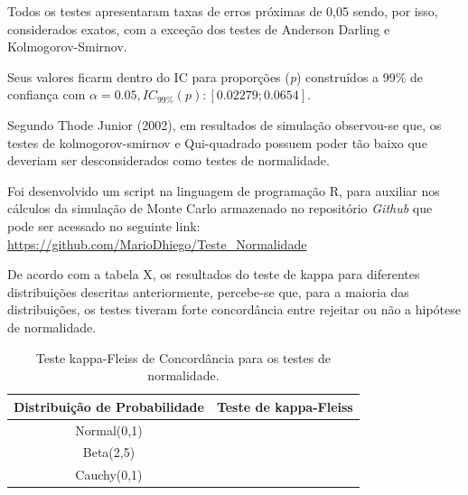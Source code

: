\documentclass[a4paper,11pt]{article} %
\begin{document}
Todos os testes apresentaram taxas de erros próximas de 0,05 sendo, por isso, considerados exatos, com a exceção dos testes de Anderson Darling e Kolmogorov-Smirnov. \vskip0.3cm

Seus valores ficarm dentro do IC para proporções (\textit{p}) construídos a 99\% de confiança com $\alpha = 0.05, IC_{99\%}(p): [0.02279;0.0654].$
\vskip0.3cm

Segundo Thode Junior (2002), em resultados de simulação observou-se que, os testes de kolmogorov-smirnov e Qui-quadrado possuem poder tão baixo que deveriam ser desconsiderados como testes de normalidade.\vskip0.3cm

Foi desenvolvido um script na linguagem de programação R, para auxiliar nos cálculos da simulação de Monte Carlo armazenado no repositório \textit{Github} que pode ser acessado no seguinte link: \href{https://github.com/MarioDhiego/Teste\_Normalidade}{https://github.com/MarioDhiego/Teste\_Normalidade}

\vskip0.3cm


De acordo com a tabela X, os resultados do teste de kappa para diferentes distribuições descritas anteriormente, percebe-se que, para a maioria das distribuições, os testes tiveram forte concordância entre rejeitar ou não a hipótese de normalidade. 



\begin{table}[H]
\centering
 \begin{tabular}{c|c}
\hline \hline
Distribuição de Probabilidade  &  Teste de kappa-Fleiss\\
\hline
      Normal(0,1)              &  \\
      Beta(2,5)                &  \\
      Cauchy(0,1)              &  \\
\hline \hline
    \end{tabular}
    \caption{Teste kappa-Fleiss de Concordância para os testes de normalidade.}
    \label{tab:my_label}
\end{table}
\end{document}
